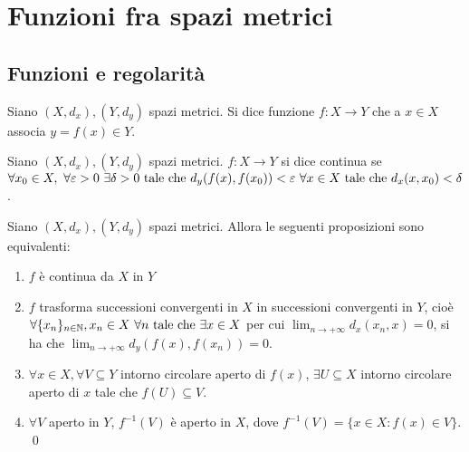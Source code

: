\chapter{Funzioni fra spazi metrici}\label{chap:functions}

\section{Funzioni e regolarità}

\begin{definition}
    Siano $(X, d_x), (Y, d_y)$ spazi metrici. Si dice funzione $f: X \to Y$ che a $x \in X$ associa $y = f(x) \in Y$.
\end{definition}

\begin{definition}
    \label{def:f_cont}
    Siano $(X, d_x), (Y, d_y)$ spazi metrici. $f: X \to Y$ si dice continua se $\forall x_0 \in X, \ \forall \varepsilon > 0 \ \exists \delta > 0 \tc d_y(f(x), f(x_0)) < \varepsilon \ \forall x \in X \tc d_x(x, x_0) < \delta$.
\end{definition}

\begin{theorem}
    Siano $(X, d_x), (Y, d_y)$ spazi metrici. Allora le seguenti proposizioni sono equivalenti:
    \begin{enumerate}
        \item $f$ è continua da $X$ in $Y$
        
        \item $f$ trasforma successioni convergenti in $X$ in successioni convergenti in $Y$, cioè $\forall \{x_n\}_{n \in \N}, x_n \in X \ \forall n \tc \exists x \in X$ per cui $\displaystyle \lim_{n \to +\infty}d_x(x_n, x)=0$, si ha che $\displaystyle \lim_{n \to +\infty}d_y(f(x),f(x_n))=0$.
        
        \item $\forall x \in X, \forall V \subseteq Y$ intorno circolare aperto di $f(x)$, $\exists U \subseteq X$ intorno circolare aperto di $x$ tale che $f(U) \subseteq V$.

        \item $\forall V$ aperto in $Y$, $f^{-1}(V)$ è aperto in $X$, dove $f^{-1}(V)=\{x \in X : f(x) \in V\}$.
        \qed
    \end{enumerate}
\end{theorem}

